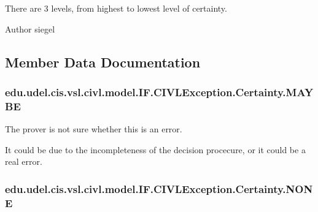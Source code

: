 There are 3 levels, from highest to lowest level of certainty.

\begin{DoxyAuthor}{Author}
siegel 
\end{DoxyAuthor}


\subsection{Member Data Documentation}
\hypertarget{enumedu_1_1udel_1_1cis_1_1vsl_1_1civl_1_1model_1_1IF_1_1CIVLException_1_1Certainty_a851ab28efb94a35e3ff308aa9a5f96ad}{}
\subsubsection[{M\+A\+Y\+B\+E}]{\setlength{\rightskip}{0pt plus 5cm}edu.\+udel.\+cis.\+vsl.\+civl.\+model.\+I\+F.\+C\+I\+V\+L\+Exception.\+Certainty.\+M\+A\+Y\+B\+E}\label{enumedu_1_1udel_1_1cis_1_1vsl_1_1civl_1_1model_1_1IF_1_1CIVLException_1_1Certainty_a851ab28efb94a35e3ff308aa9a5f96ad}


The prover is not sure whether this is an error. 

It could be due to the incompleteness of the decision procecure, or it could be a real error. \hypertarget{enumedu_1_1udel_1_1cis_1_1vsl_1_1civl_1_1model_1_1IF_1_1CIVLException_1_1Certainty_af60043eefee9873a5c20bb43e541de3e}{}
\subsubsection[{N\+O\+N\+E}]{\setlength{\rightskip}{0pt plus 5cm}edu.\+udel.\+cis.\+vsl.\+civl.\+model.\+I\+F.\+C\+I\+V\+L\+Exception.\+Certainty.\+N\+O\+N\+E}\label{enumedu_1_1udel_1_1cis_1_1vsl_1_1civl_1_1model_1_1IF_1_1CIVLException_1_1Certainty_af60043eefee9873a5c20bb43e541de3e}


